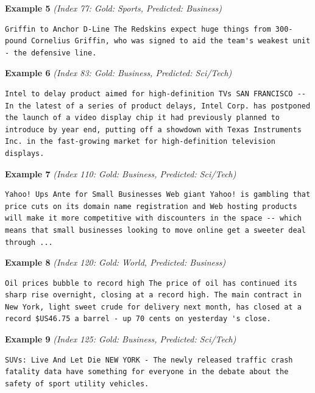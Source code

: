\noindent
\textbf{Example 5} \quad \textit{(Index 77: Gold: Sports, Predicted: Business)}

\begin{Verbatim}[breaklines=true,breakanywhere=true,fontsize=\small]
Griffin to Anchor D-Line The Redskins expect huge things from 300-pound Cornelius Griffin, who was signed to aid the team's weakest unit - the defensive line.
\end{Verbatim}

\noindent
\textbf{Example 6} \quad \textit{(Index 83: Gold: Business, Predicted: Sci/Tech)}

\begin{Verbatim}[breaklines=true,breakanywhere=true,fontsize=\small]
Intel to delay product aimed for high-definition TVs SAN FRANCISCO -- In the latest of a series of product delays, Intel Corp. has postponed the launch of a video display chip it had previously planned to introduce by year end, putting off a showdown with Texas Instruments Inc. in the fast-growing market for high-definition television displays.
\end{Verbatim}

\noindent
\textbf{Example 7} \quad \textit{(Index 110: Gold: Business, Predicted: Sci/Tech)}

\begin{Verbatim}[breaklines=true,breakanywhere=true,fontsize=\small]
Yahoo! Ups Ante for Small Businesses Web giant Yahoo! is gambling that price cuts on its domain name registration and Web hosting products will make it more competitive with discounters in the space -- which means that small businesses looking to move online get a sweeter deal through ...
\end{Verbatim}

\noindent
\textbf{Example 8} \quad \textit{(Index 120: Gold: World, Predicted: Business)}

\begin{Verbatim}[breaklines=true,breakanywhere=true,fontsize=\small]
Oil prices bubble to record high The price of oil has continued its sharp rise overnight, closing at a record high. The main contract in New York, light sweet crude for delivery next month, has closed at a record $US46.75 a barrel - up 70 cents on yesterday 's close.
\end{Verbatim}

\noindent
\textbf{Example 9} \quad \textit{(Index 125: Gold: Business, Predicted: Sci/Tech)}

\begin{Verbatim}[breaklines=true,breakanywhere=true,fontsize=\small]
SUVs: Live And Let Die NEW YORK - The newly released traffic crash fatality data have something for everyone in the debate about the safety of sport utility vehicles.
\end{Verbatim}

